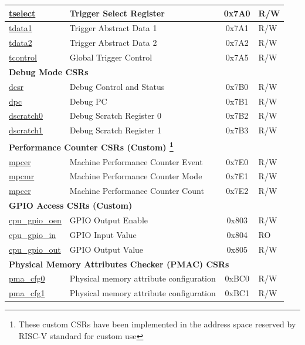 \begin{longtable}{ | p{4.0cm} | p{8.4cm} | c | l | }
\hyperref[regdesc:TSELECT]{tselect} & Trigger Select Register & 0x7A0 & R/W \\\hline
\hyperref[regdesc:TDATA1]{tdata1} & Trigger Abstract Data 1 & 0x7A1 & R/W \\\hline
\hyperref[regdesc:TDATA2]{tdata2} & Trigger Abstract Data 2 & 0x7A2 & R/W \\\hline
\hyperref[regdesc:TCONTROL]{tcontrol} & Global Trigger Control & 0x7A5 & R/W \\\hline
\multicolumn{4}{|l|}{\textbf{Debug Mode CSRs}} \\\hline
\hyperref[regdesc:DCSR]{dcsr} & Debug Control and Status  & 0x7B0 & R/W \\\hline
\hyperref[regdesc:DPC]{dpc} & Debug PC & 0x7B1 & R/W \\\hline
\hyperref[regdesc:DSCRATCH0]{dscratch0} & Debug Scratch Register 0 & 0x7B2 & R/W \\\hline
\hyperref[regdesc:DSCRATCH1]{dscratch1} & Debug Scratch Register 1 & 0x7B3 & R/W \\\hline
\multicolumn{4}{|l|}{\textbf{Performance Counter CSRs (Custom) \footnote{These custom CSRs have been implemented in the address space reserved by RISC-V standard for custom use}}} \\\hline
\hyperref[regdesc:MPCER]{mpcer} & Machine Performance Counter Event & 0x7E0 & R/W \\\hline
\hyperref[regdesc:MPCMR]{mpcmr} & Machine Performance Counter Mode & 0x7E1 & R/W \\\hline
\hyperref[regdesc:MPCCR]{mpccr} & Machine Performance Counter Count & 0x7E2 & R/W \\\hline
\multicolumn{4}{|l|}{\textbf{GPIO Access CSRs (Custom)}} \\\hline
\hyperref[regdesc:GPIO_OEN]{cpu\_gpio\_oen} & GPIO Output Enable & 0x803 & R/W \\\hline
\hyperref[regdesc:GPIO_IN]{cpu\_gpio\_in} & GPIO Input Value & 0x804 & RO \\\hline
\hyperref[regdesc:GPIO_OUT]{cpu\_gpio\_out} & GPIO Output Value & 0x805 & R/W \\\hline
\multicolumn{4}{|l|}{\textbf{Physical Memory Attributes Checker (PMAC) CSRs}} \\\hline
\hyperref[sec:riscvcpu-pma-reg-desc]{pma\_cfg0} & Physical memory attribute configuration & 0xBC0 & R/W \\\hline
\hyperref[sec:riscvcpu-pma-reg-desc]{pma\_cfg1} & Physical memory attribute configuration & 0xBC1 & R/W \\\hline

\end{longtable}
